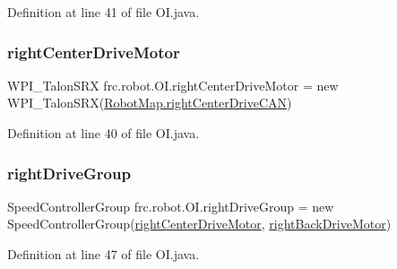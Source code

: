 Definition at line 41 of file O\+I.\+java.

\mbox{\label{classfrc_1_1robot_1_1_o_i_a9be3279c18d1f3433d6b07c706eb1457}} 
\subsubsection{\texorpdfstring{right\+Center\+Drive\+Motor}{rightCenterDriveMotor}}
{\footnotesize\ttfamily W\+P\+I\+\_\+\+Talon\+S\+RX frc.\+robot.\+O\+I.\+right\+Center\+Drive\+Motor = new W\+P\+I\+\_\+\+Talon\+S\+RX(\hyperlink{classfrc_1_1robot_1_1_robot_map_a3ca36356410531e52126d2979ee17f13}{Robot\+Map.\+right\+Center\+Drive\+C\+AN})\hspace{0.3cm}{\ttfamily [static]}}



Definition at line 40 of file O\+I.\+java.

\mbox{\label{classfrc_1_1robot_1_1_o_i_a1595c2b8ebd7e4e467027b2eb21983ee}} 
\subsubsection{\texorpdfstring{right\+Drive\+Group}{rightDriveGroup}}
{\footnotesize\ttfamily Speed\+Controller\+Group frc.\+robot.\+O\+I.\+right\+Drive\+Group = new Speed\+Controller\+Group(\hyperlink{classfrc_1_1robot_1_1_o_i_a9be3279c18d1f3433d6b07c706eb1457}{right\+Center\+Drive\+Motor}, \hyperlink{classfrc_1_1robot_1_1_o_i_a5f2937beffdc7dd1d937aaff36f20c1e}{right\+Back\+Drive\+Motor})\hspace{0.3cm}{\ttfamily [static]}}



Definition at line 47 of file O\+I.\+java.

\mbox{\label{classfrc_1_1robot_1_1_o_i_ae055ab4ea5a306737c950b1bfddf7352}} 
